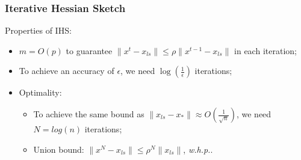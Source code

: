 \documentclass{beamer}
\begin{document}
\begin{frame}
    \frametitle{Iterative Hessian Sketch}

    Properties of IHS:
    \begin{itemize}
        \item<1-> $m = O(p)$ to guarantee $\|x^t - x_{ls}\| \leq \rho
            \|x^{t-1} - x_{ls}\|$ in each iteration;
        \item<2-> To achieve an accuracy of $\epsilon$, we need
            $\log(\frac{1}{\epsilon})$ iterations;
        \item<3-> Optimality:
            \begin{itemize}
                \item<3-> To achieve the same bound as $\|x_{ls} - x_*\|\approx
                    O(\frac{1}{\sqrt{n}})$, we need $N=log(n)$ iterations;
                \item<4-> Union bound: $\|x^N - x_{ls}\| \leq
                    \rho^N \|x_{ls}\|$, \textit{w.h.p.}.
            \end{itemize}
    \end{itemize}
\end{frame}
\end{document}

